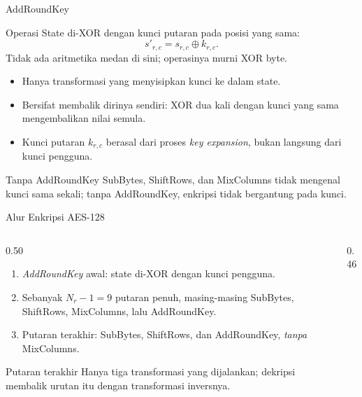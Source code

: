 \documentclass[aspectratio=169,11pt]{beamer}
\begin{document}
\begin{frame}{AddRoundKey}
    \footnotesize
    \begin{block}{Operasi}
        State di-XOR dengan kunci putaran pada posisi yang sama:
        \[
            s'_{r,c} = s_{r,c} \oplus k_{r,c}.
        \]
        Tidak ada aritmetika medan di sini; operasinya murni XOR byte.
    \end{block}
    \vspace{0.1cm}
    \begin{itemize}
        \item Hanya transformasi yang menyisipkan kunci ke dalam state.
        \item Bersifat membalik dirinya sendiri: XOR dua kali dengan kunci
              yang sama mengembalikan nilai semula.
        \item Kunci putaran $k_{r,c}$ berasal dari proses
              \textit{key expansion}, bukan langsung dari kunci pengguna.
    \end{itemize}
    \vspace{0.05cm}
    \begin{alertblock}{Tanpa AddRoundKey}
        \footnotesize
        SubBytes, ShiftRows, dan MixColumns tidak mengenal kunci sama
        sekali; tanpa AddRoundKey, enkripsi tidak bergantung pada kunci.
    \end{alertblock}
\end{frame}

\begin{frame}{Alur Enkripsi AES-128}
    \footnotesize
    \begin{columns}[T,onlytextwidth]
        \begin{column}{0.50\textwidth}
            \begin{enumerate}
                \item \textit{AddRoundKey} awal: state di-XOR dengan kunci
                      pengguna.
                \item Sebanyak $N_r - 1 = 9$ putaran penuh, masing-masing
                      SubBytes, ShiftRows, MixColumns, lalu AddRoundKey.
                \item Putaran terakhir: SubBytes, ShiftRows, dan
                      AddRoundKey, \emph{tanpa} MixColumns.
            \end{enumerate}
            \vspace{0.1cm}
            \begin{alertblock}{Putaran terakhir}
                \footnotesize
                Hanya tiga transformasi yang dijalankan; dekripsi membalik
                urutan itu dengan transformasi inversnya.
            \end{alertblock}
        \end{column}
        \begin{column}{0.46\textwidth}
            \centering
        \end{column}
    \end{columns}
\end{frame}
\end{document}
